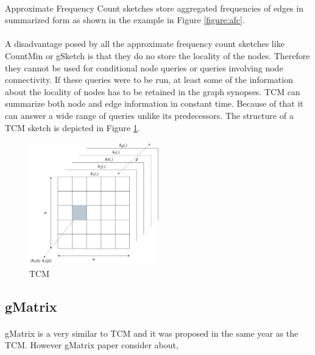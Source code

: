 \paragraph{}
Approximate Frequency Count sketches store aggregated frequencies of edges in summarized form as shown in the example in Figure \ref{figure:afc}.

\paragraph{}
A disadvantage posed by all the approximate frequency count sketches like CountMin\cite{cormode_improved_2003} or gSketch\cite{zhao_gsketch:_2011} is that they do no store the locality of the nodes. Therefore they cannot be used for conditional node queries or queries involving node connectivity. If these queries were to be run, at least some of the information about the locality of nodes has to be retained in the graph synopses. TCM\cite{tang_graph_2016} can summarize both node and edge information in constant time. Because of that it can answer a wide range of queries unlike its predecessors. The structure of a TCM sketch is depicted in Figure \ref{figure:tcm}.

\begin{figure}[H]
    \centering
    \includegraphics[width=0.5\textwidth]{images/tcm}
    \caption{TCM}
    \label{figure:tcm}
\end{figure}

\subsection{gMatrix}

\paragraph{}
gMatrix\cite{khan_query-friendly_2016} is a very similar to TCM and it was proposed in the same year as the TCM. However gMatrix\cite{khan_query-friendly_2016} paper consider about,

